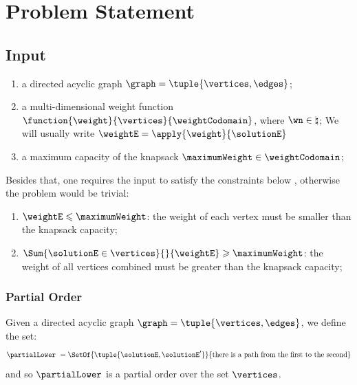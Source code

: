 \section{Problem Statement}

\subsection{Input}

\begin{enumerate}
    \item a directed acyclic graph $\graph = \tuple{\vertices,\edges}$;
    \item a multi-dimensional weight function $\function{\weight}{\vertices}{\weightCodomain}$, where $\wn \in \natural$;
        \subitem We will usually write $\weightE = \apply{\weight}{\solutionE}$
    \item a maximum capacity of the knapsack $\maximumWeight \in \weightCodomain$;
\end{enumerate}

Besides that, one requires the input to satisfy the constraints below \cite{bib:constrained-knapsack}, otherwise the problem would be trivial:

\begin{enumerate}
    \item $\weightE \leqslant \maximumWeight$: the weight of each vertex must be smaller than the knapsack capacity;
    \item $\Sum{\solutionE \in \vertices}{}{\weightE} \geqslant \maximumWeight$: the weight of all vertices combined must be greater than the knapsack capacity;
\end{enumerate}

\subsubsection{Partial Order}

\begin{defn}
    Given a directed acyclic graph $\graph = \tuple{\vertices,\edges}$, we define the set:
    \begin{equation}
        \partialLower
        \ =
        \SetOf
            {\tuple{\solutionE, \solutionE'}}
            {\mbox{there is a path from the first to the second}}
    \end{equation}
    and so $\partialLower$ is a partial order over the set $\vertices$.
\end{defn}

